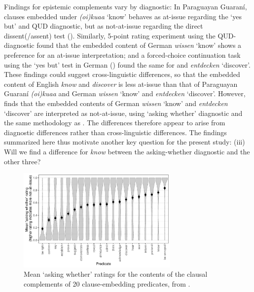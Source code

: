 \documentclass[times,linguex,xcolor]{glossa}
\begin{document}
  Findings for epistemic complements vary by diagnostic: In Paraguayan Guaraní, clauses embedded under \emph{(oi)kuaa} `know' behaves as at-issue regarding the `yes but' and QUD diagnostic, but as not-at-issue regarding the direct dissent(/assent) test (\citealt{tonhauser_diagnosing_2012}). Similarly,  5-point rating experiment using the QUD-diagnostic found that the embedded content of German \emph{wissen} `know' shows a preference for an at-issue interpretation; and a forced-choice continuation task using the `yes but' test in German (\citealt{xue_correlation_2011}) found the same for and \emph{entdecken} `discover'.
  These findings could suggest cross-linguistic differences, so that the embedded content of English \emph{know} and \emph{discover} is less at-issue than that of Paraguayan Guaraní \emph{(oi)kuaa} and German \emph{wissen} `know' and \emph{entdecken} `discover'.  However, \citealt{solstad_cataphoric_2024} finds that the embedded contents of German \emph{wissen} `know' and \emph{entdecken} `discover' are interpreted as not-at-issue, using `asking whether' diagnostic and the same methodology as \citealt{tonhauser_how_2018,degen-tonhauser-glossa}. The differences therefore appear to arise from diagnostic differences rather than cross-linguistic differences. The findings summarized here thus motivate another key question for the present study: (iii) Will we find a difference for \emph{know} between the asking-whether diagnostic and the other three?
  
  \begin{figure}[h!]
  \centering

  \includegraphics[width=0.7\textwidth]{../../results/main/degen-tonhauser-glossa/graphs/mean-asking-whether-ratings.pdf}

  \caption{Mean `asking whether' ratings for the contents of the clausal complements of 20 clause-embedding predicates, from \citealt{degen-tonhauser-glossa}.}
  \label{fig:dtglossa}
  \end{figure}
  
\end{document}
